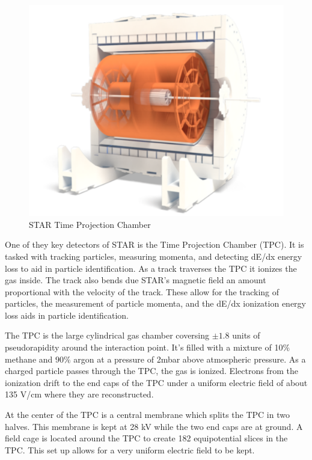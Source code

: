 \documentclass[abstract = on,listof=totoc, bibliography=totoc]{scrreprt}
\begin{document}
\begin{figure}[h!]
\begin{center}
\includegraphics[width = .7\textwidth]{TPCfull}
\caption[STAR Time Projection Chamber]{STAR Time Projection Chamber}
\label{fig:tpcSchem}
\end{center}
\end{figure}


One of they key detectors of STAR is the Time Projection Chamber (TPC). It is tasked with tracking particles, measuring momenta, and detecting dE/dx energy loss to aid in particle identification. As a track traverses the TPC it ionizes the gas inside. The track also bends due STAR's magnetic field an amount proportional with the velocity of the track. These allow for the tracking of particles, the measurement of particle momenta, and the dE/dx ionization energy loss aids in particle identification. 





The TPC is the large cylindrical gas chamber coversing $\pm1.8$ units of pseudorapidity around the interaction point. It's filled with a mixture of 10$\%$ methane and $90\%$ argon at a pressure of 2mbar above atmospheric pressure. As a charged particle passes through the TPC, the gas is ionized. Electrons from the ionization drift to the end caps of the TPC under a uniform electric field of about 135 V/cm where they are reconstructed.

At the center of the TPC is a central membrane which splits the TPC in two halves. This membrane is kept at 28 kV while the two end caps are at ground. A field cage is located around the TPC to create 182 equipotential slices in the TPC. This set up allows for a very uniform electric field to be kept.   
\end{document}

